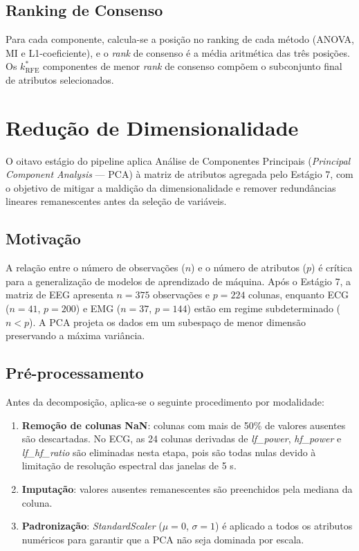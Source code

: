 \subsection{Ranking de Consenso}

Para cada componente, calcula-se a posição no ranking de cada método (ANOVA, MI e L1-coeficiente), e o \textit{rank} de consenso é a média aritmética das três posições. Os $k^*_{\text{RFE}}$ componentes de menor \textit{rank} de consenso compõem o subconjunto final de atributos selecionados.

\section{Redução de Dimensionalidade}
\label{sec:metodo_reducao}

O oitavo estágio do pipeline aplica Análise de Componentes Principais (\textit{Principal Component Analysis} --- PCA) à matriz de atributos agregada pelo Estágio 7, com o objetivo de mitigar a maldição da dimensionalidade e remover redundâncias lineares remanescentes antes da seleção de variáveis.

\subsection{Motivação}

A relação entre o número de observações ($n$) e o número de atributos ($p$) é crítica para a generalização de modelos de aprendizado de máquina. Após o Estágio 7, a matriz de EEG apresenta $n = 375$ observações e $p = 224$ colunas, enquanto ECG ($n = 41$, $p = 200$) e EMG ($n = 37$, $p = 144$) estão em regime subdeterminado ($n < p$). A PCA projeta os dados em um subespaço de menor dimensão preservando a máxima variância.

\subsection{Pré-processamento}

Antes da decomposição, aplica-se o seguinte procedimento por modalidade:

\begin{enumerate}
    \item \textbf{Remoção de colunas NaN}: colunas com mais de 50\% de valores ausentes são descartadas. No ECG, as 24 colunas derivadas de \textit{lf\_power}, \textit{hf\_power} e \textit{lf\_hf\_ratio} são eliminadas nesta etapa, pois são todas nulas devido à limitação de resolução espectral das janelas de 5 s.
    \item \textbf{Imputação}: valores ausentes remanescentes são preenchidos pela mediana da coluna.
    \item \textbf{Padronização}: \textit{StandardScaler} ($\mu = 0$, $\sigma = 1$) é aplicado a todos os atributos numéricos para garantir que a PCA não seja dominada por escala.
\end{enumerate}

